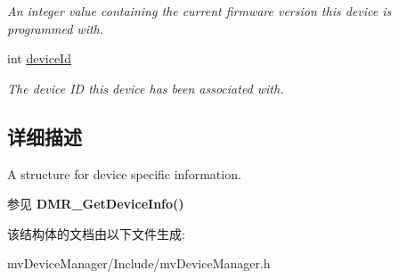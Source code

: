 \begin{DoxyCompactItemize}
\begin{DoxyCompactList}\small\item\em An integer value containing the current firmware version this device is programmed with. \end{DoxyCompactList}\item 
\hypertarget{struct_t_d_m_r___device_info_a800ba8fcab65a3c8e84d2d3af8e2c9e2}{int \hyperlink{struct_t_d_m_r___device_info_a800ba8fcab65a3c8e84d2d3af8e2c9e2}{device\+Id}}\label{struct_t_d_m_r___device_info_a800ba8fcab65a3c8e84d2d3af8e2c9e2}

\begin{DoxyCompactList}\small\item\em The device I\+D this device has been associated with. \end{DoxyCompactList}\end{DoxyCompactItemize}


\subsection{详细描述}
A structure for device specific information. 

\begin{DoxySeeAlso}{参见}
{\bfseries D\+M\+R\+\_\+\+Get\+Device\+Info()} 
\end{DoxySeeAlso}


该结构体的文档由以下文件生成\+:\begin{DoxyCompactItemize}
\item 
mv\+Device\+Manager/\+Include/mv\+Device\+Manager.\+h\end{DoxyCompactItemize}
